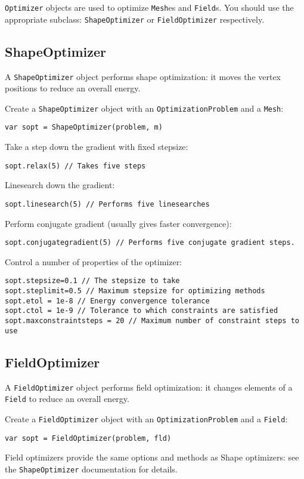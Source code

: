\texttt{Optimizer} objects are used to optimize \texttt{Mesh}es and
\texttt{Field}s. You should use the appropriate subclass:
\texttt{ShapeOptimizer} or \texttt{FieldOptimizer} respectively.

\hypertarget{shapeoptimizer}{%
\subsection{ShapeOptimizer}\label{shapeoptimizer}}

A \texttt{ShapeOptimizer} object performs shape optimization: it moves
the vertex positions to reduce an overall energy.

Create a \texttt{ShapeOptimizer} object with an
\texttt{OptimizationProblem} and a \texttt{Mesh}:

\begin{lstlisting}
var sopt = ShapeOptimizer(problem, m)
\end{lstlisting}

Take a step down the gradient with fixed stepsize:

\begin{lstlisting}
sopt.relax(5) // Takes five steps
\end{lstlisting}

Linesearch down the gradient:

\begin{lstlisting}
sopt.linesearch(5) // Performs five linesearches
\end{lstlisting}

Perform conjugate gradient (usually gives faster convergence):

\begin{lstlisting}
sopt.conjugategradient(5) // Performs five conjugate gradient steps.
\end{lstlisting}

Control a number of properties of the optimizer:

\begin{lstlisting}
sopt.stepsize=0.1 // The stepsize to take
sopt.steplimit=0.5 // Maximum stepsize for optimizing methods
sopt.etol = 1e-8 // Energy convergence tolerance
sopt.ctol = 1e-9 // Tolerance to which constraints are satisfied
sopt.maxconstraintsteps = 20 // Maximum number of constraint steps to use
\end{lstlisting}

\hypertarget{fieldoptimizer}{%
\subsection{FieldOptimizer}\label{fieldoptimizer}}

A \texttt{FieldOptimizer} object performs field optimization: it changes
elements of a \texttt{Field} to reduce an overall energy.

Create a \texttt{FieldOptimizer} object with an
\texttt{OptimizationProblem} and a \texttt{Field}:

\begin{lstlisting}
var sopt = FieldOptimizer(problem, fld)
\end{lstlisting}

Field optimizers provide the same options and methods as Shape
optimizers: see the \texttt{ShapeOptimizer} documentation for details.
